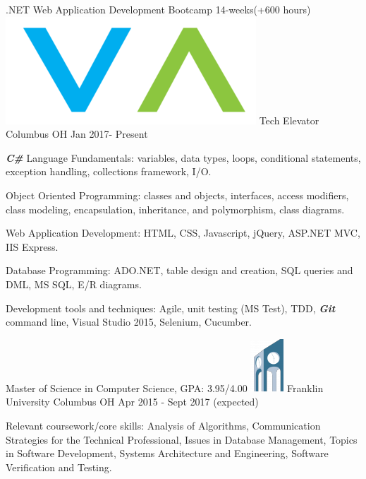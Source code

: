 \begin{cventries}
 \vspace{-2mm} \cventry
    {.NET Web Application Development Bootcamp 14-weeks(+600 hours)}
    {\includegraphics[scale=0.20]{img/download.png} Tech Elevator}
    {Columbus OH}
    {Jan 2017- Present}
    {
      \begin{cvitems}     
        \item {\textbf{\textit{C\#}} Language Fundamentals: variables, data types, loops, conditional statements, exception handling, collections framework, I/O.}
        \item {Object Oriented Programming: classes and objects, interfaces, access modifiers, class modeling, encapsulation, inheritance, and polymorphism, class diagrams.}
         \item {Web Application Development: HTML, CSS, Javascript, jQuery, ASP.NET MVC, IIS Express.}
         \item {Database Programming: ADO.NET, table design and creation, SQL queries and DML, MS SQL, E/R diagrams.}
         \item {Development tools and techniques: Agile, unit testing (MS Test), TDD, \textbf{\textit{Git}} command line, Visual Studio 2015, Selenium, Cucumber.}
      \end{cvitems}\vspace{-3mm}
    }
    \vspace{-2mm} \cventry
    {Master of Science in Computer Science, GPA: 3.95/4.00}
    {\includegraphics[scale=0.33]{img/franklinuniversity-190x75.png} Franklin University}
    {Columbus OH}
    {Apr 2015 - Sept 2017 (expected)}
    {
      \begin{cvitems}     
        \item {Relevant coursework/core skills: Analysis of Algorithms, Communication Strategies for the Technical Professional, Issues in Database Management, Topics in Software Development, Systems Architecture and Engineering, Software Verification and Testing.}     

\end{cvitems}}
\end{cventries}
